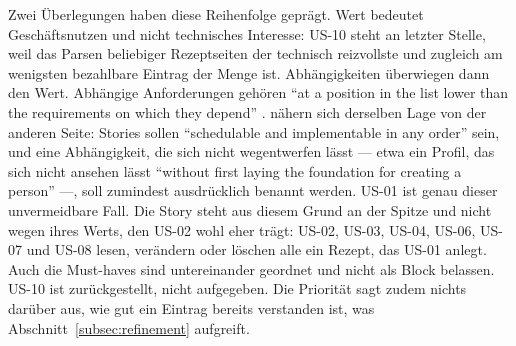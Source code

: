%
%
Zwei Überlegungen haben diese Reihenfolge geprägt. Wert bedeutet
Geschäftsnutzen und nicht technisches Interesse: US-10 steht an letzter Stelle,
weil das Parsen beliebiger Rezeptseiten der technisch reizvollste und zugleich
am wenigsten bezahlbare Eintrag der Menge ist. Abhängigkeiten überwiegen dann den
Wert. Abhängige Anforderungen gehören \enquote{at a
position in the list lower than the requirements on which they depend}
\parencite[p.~87]{schwaber2004}. \textcite[p.~389]{lucassen2016} nähern sich
derselben Lage von der anderen Seite: Stories sollen \enquote{schedulable and
implementable in any order} sein, und eine Abhängigkeit, die sich nicht
wegentwerfen lässt --- etwa ein Profil, das sich nicht ansehen lässt
\enquote{without first laying the foundation for creating a person} ---, soll
zumindest ausdrücklich benannt werden. US-01 ist genau
dieser unvermeidbare Fall. Die Story steht aus diesem Grund an der Spitze und
nicht wegen ihres Werts, den US-02 wohl eher trägt: US-02, US-03, US-04, US-06,
US-07 und US-08 lesen, verändern oder löschen alle ein Rezept, das US-01 anlegt.
Auch die Must-haves sind untereinander geordnet und nicht als Block belassen.
US-10 ist zurückgestellt, nicht aufgegeben. Die Priorität sagt zudem nichts
darüber aus, wie gut ein Eintrag bereits verstanden ist, was
Abschnitt~\ref{subsec:refinement} aufgreift.



